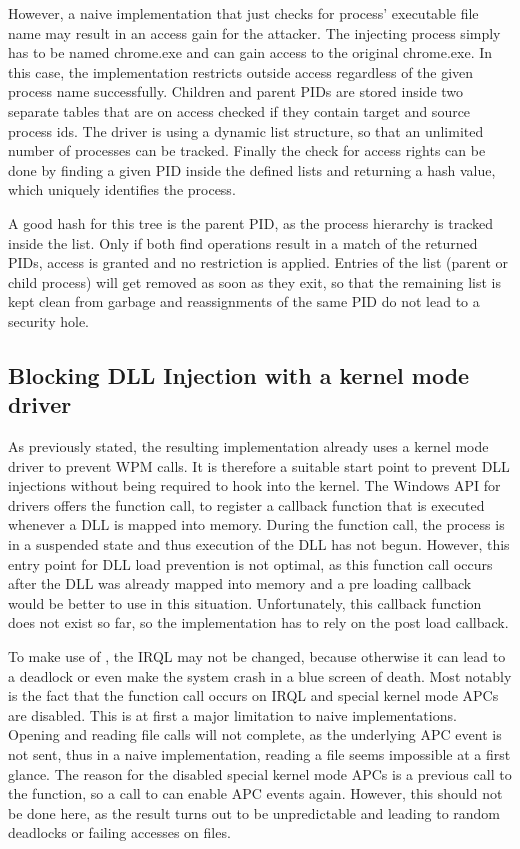 However, a naive implementation that just checks for process' executable file name may result in an access gain for the attacker. The injecting process simply has to be named chrome.exe and can gain access to the original chrome.exe. In this case, the implementation restricts outside access regardless of the given process name successfully. Children and parent \glspl{PID} are stored inside two separate tables that are on access checked if they contain target and source process ids. The driver is using a dynamic list structure, so that an unlimited number of processes can be tracked. Finally the check for access rights can be done by finding a given \gls{PID} inside the defined lists and returning a hash value, which uniquely identifies the process. 

A good hash for this tree is the parent \gls{PID}, as the process hierarchy is tracked inside the list. Only if both find operations result in a match of the returned \glspl{PID}, access is granted and no restriction is applied. Entries of the list (parent or child process) will get removed as soon as they exit, so that the remaining list is kept clean from garbage and reassignments of the same \gls{PID} do not lead to a security hole.

\subsection{Blocking DLL Injection with a kernel mode driver}
As previously stated, the resulting implementation already uses a kernel mode driver to prevent \gls{WPM} calls. It is therefore a suitable start point to prevent \gls{DLL} injections without being required to hook into the kernel. The Windows \gls{API} for drivers offers the  function call, to register a callback function that is executed whenever a \gls{DLL} is mapped into memory. During the function call, the process is in a suspended state and thus execution of the \gls{DLL} has not begun. However, this entry point for \gls{DLL} load prevention is not optimal, as this function call occurs after the \gls{DLL} was already mapped into memory and a pre loading callback would be better to use in this situation. Unfortunately, this callback function does not exist so far, so the implementation has to rely on the post load callback.

To make use of , the \gls{IRQL} may not be changed, because otherwise it can lead to a deadlock or even make the system crash in a blue screen of death. Most notably is the fact that the function call occurs on \gls{IRQL}  and special kernel mode \glspl{APC} are disabled. This is at first a major limitation to naive implementations. Opening and reading file calls will not complete, as the underlying \gls{APC} event is not sent, thus in a naive implementation, reading a file seems impossible at a first glance. The reason for the disabled special kernel mode \glspl{APC} is a previous call to the  function, so a call to  can enable \gls{APC} events again. However, this should not be done here, as the result turns out to be unpredictable and leading to random deadlocks or failing accesses on files.

